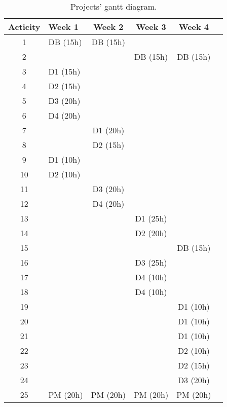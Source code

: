 \begin{table}
    \centering
	\begin{tabular}{|c|l|c|c|c|c|}
	\hline
	\textbf{Acticity}& \textbf{Week 1}& \textbf{Week 2}& \textbf{Week 3}& \textbf{Week 4}\\ \hline
	1 & DB (15h) & DB (15h) & & \\ 
	2 & & & DB (15h) & DB (15h)\\ 
	3 & D1 (15h) & & & \\ 
	4 & D2 (15h) & & & \\ 
	5 & D3 (20h) & & & \\ 
	6 & D4 (20h) & & & \\ 
	7 & & D1 (20h) & & \\ 
	8 & & D2 (15h) & & \\ 
	9 & D1 (10h) & & & \\ 
	10 & D2 (10h) & & & \\ 
	11 & & D3 (20h) & & \\ 
	12 & & D4 (20h) & & \\ 
	13 & & & D1 (25h) & \\ 
	14 & & & D2 (20h) & \\ 
	15 & & & & DB (15h) \\ 
	16 & & & D3 (25h) & \\
	17 & & & D4 (10h) & \\ 
	18 & & & D4 (10h) & \\ 
	19 & & & & D1 (10h) \\ 
	20 & & & & D1 (10h) \\ 
	21 & & & & D1 (10h) \\ 
	22 & & & & D2 (10h) \\ 
	23 & & & & D2 (15h) \\ 
	24 & & & & D3 (20h) \\ 
	25 & PM (20h) & PM (20h) & PM (20h) & PM (20h) \\ \hline
	\end{tabular}
\caption {Projects' gantt diagram.}
\end{table}
